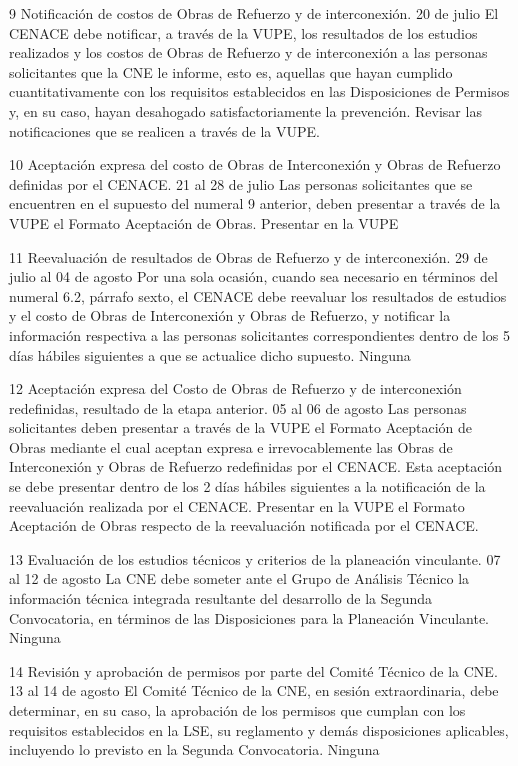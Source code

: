  9
 Notificación de costos de Obras de Refuerzo y de interconexión.
 20 de julio
 El CENACE debe notificar, a través de la VUPE, los resultados de los estudios realizados y los costos de Obras de Refuerzo y de interconexión a las personas solicitantes que la CNE le informe, esto es, aquellas que hayan cumplido cuantitativamente con los requisitos establecidos en las Disposiciones de Permisos y, en su caso, hayan desahogado satisfactoriamente la prevención.
 Revisar las notificaciones que se realicen a través de la VUPE.
 
 10
 Aceptación expresa del costo de Obras de Interconexión y Obras de Refuerzo definidas por el CENACE.
 21 al 28 de julio
 Las personas solicitantes que se encuentren en el supuesto del numeral 9 anterior, deben presentar a través de la VUPE el Formato Aceptación de Obras.
 Presentar en la VUPE
 
 11
 Reevaluación de resultados de Obras de Refuerzo y de interconexión.
 29 de julio al 04 de agosto
 Por una sola ocasión, cuando sea necesario en términos del numeral 6.2, párrafo sexto, el CENACE debe reevaluar los resultados de estudios y el costo de Obras de Interconexión y Obras de Refuerzo, y notificar la información respectiva a las personas solicitantes correspondientes dentro de los 5 días hábiles siguientes a que se actualice dicho supuesto.
 Ninguna
 
 12
 Aceptación expresa del Costo de Obras de Refuerzo y de interconexión redefinidas, resultado de la etapa anterior.
 05 al 06 de agosto
 Las personas solicitantes deben presentar a través de la VUPE el Formato Aceptación de Obras mediante el cual aceptan expresa e irrevocablemente las Obras de Interconexión y Obras de Refuerzo redefinidas por el CENACE. Esta aceptación se debe presentar dentro de los 2 días hábiles siguientes a la notificación de la reevaluación realizada por el CENACE.
 Presentar en la VUPE el Formato Aceptación de Obras respecto de la reevaluación notificada por el CENACE.
 
 13
 Evaluación de los estudios técnicos y criterios de la planeación vinculante.
 07 al 12 de agosto
 La CNE debe someter ante el Grupo de Análisis Técnico la información técnica integrada resultante del desarrollo de la Segunda Convocatoria, en términos de las Disposiciones para la Planeación Vinculante.
 Ninguna
 
 14
 Revisión y aprobación de permisos por parte del Comité Técnico de la CNE.
 13 al 14 de agosto
 El Comité Técnico de la CNE, en sesión extraordinaria, debe determinar, en su caso, la aprobación de los permisos que cumplan con los requisitos establecidos en la LSE, su reglamento y demás disposiciones aplicables, incluyendo lo previsto en la Segunda Convocatoria.
 Ninguna
 
